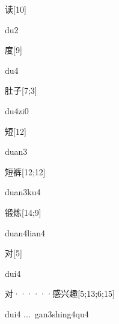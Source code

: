 \begin{verbete}[du2]{读}[10]
\begin{pronuncia}{du2}
\end{pronuncia}
\end{verbete}

\begin{verbete}[du4]{度}[9]
\begin{pronuncia}{du4}
\end{pronuncia}
\end{verbete}

\begin{verbete}[du4zi0]{肚子}[7;3]
\begin{pronuncia}{du4zi0}
\end{pronuncia}
\end{verbete}

\begin{verbete}[duan3]{短}[12]
\begin{pronuncia}{duan3}
\end{pronuncia}
\end{verbete}

\begin{verbete}[duan3ku4]{短裤}[12;12]
\begin{pronuncia}{duan3ku4}
\end{pronuncia}
\end{verbete}

\begin{verbete}{锻炼}[14;9]
\begin{pronuncia}{duan4lian4}
\end{pronuncia}
\end{verbete}

\begin{verbete}[dui4]{对}[5]
\begin{pronuncia}{dui4}
\end{pronuncia}
\end{verbete}

\begin{verbete}{对······感兴趣}[5;13;6;15]
\begin{pronuncia}[\\]{dui4 ...\  gan3shing4qu4}
\end{pronuncia}
\end{verbete}

